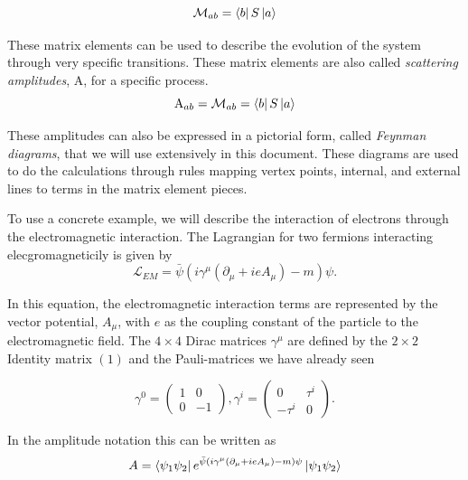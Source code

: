 \begin{equation}
\label{eq:bSa}
\mathcal{M}_{ab} = \bra{b}S\ket{a}
\end{equation}

These matrix elements can be used to describe the evolution of the system through very specific transitions. These matrix elements are also called \textit{scattering amplitudes}, $\mathrm{A}$, for a specific process.
\begin{equation}
\label{eq:Amplitude}
\mathrm{A}_{ab} = \mathcal{M}_{ab} = \bra{b}S\ket{a}
\end{equation}

These amplitudes can also be expressed in a pictorial form, called \textit{Feynman diagrams}, that we will use extensively in this document. These diagrams are used to do the calculations through rules mapping vertex points, internal, and external lines to terms in the matrix element pieces.


To use a concrete example, we will describe the interaction of electrons through the electromagnetic interaction. The Lagrangian for two fermions interacting elecgromagneticily is given by 
\begin{equation}
\label{eq:EMlagrangian}
\mathscr{L}_{EM} = \bar{\psi} \left(i\gamma^{\mu}\left(\partial_{\mu} + ieA_{\mu}\right) - m\right)\psi.
\end{equation}

In this equation, the electromagnetic interaction terms are represented by the vector potential, $A_{\mu}$, with $e$ as the coupling constant of the particle to the electromagnetic field. The $4 \times 4$ Dirac matrices $\gamma^{\mu}$ are defined by the $2 \times 2$ Identity matrix $\left(1\right)$ and the Pauli-matrices we have already seen

\begin{equation}
\label{eq:GammaMatrix}
\gamma^{0} = \begin{pmatrix} 1 & 0 \\
					       0 & -1 \end{pmatrix},
\gamma^{i} = \begin{pmatrix} 0 & \tau^{i} \\
                                               -\tau^{i} & 0 \end{pmatrix}.
\end{equation}

In the amplitude notation this can be written as
\begin{equation}
\label{eq:eeScatteringAmpl}
A = \bra{\psi_{1}\psi_{2}}e^{\bar{\psi}\left(i\gamma^{\mu}\left(\partial_{\mu} + ieA_{\mu}\right) - m\right)\psi}\ket{\psi_{1}\psi_{2}}
\end{equation}

